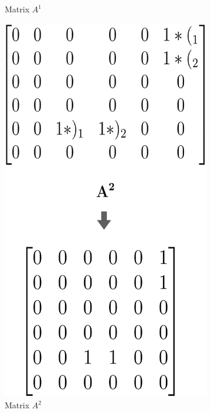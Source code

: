 \documentclass[xcolor=table,english]{beamer}
\begin{document}
\begin{frame}[fragile]
\begin{figure}
\begin{subfigure}[b]{0.2\textwidth}
            \caption{Matrix $A^1$}
        \end{subfigure}
        \hfill
        \begin{subfigure}[b]{0.268\textwidth}
            \includegraphics[width=\textwidth]{figures/cfpq_2.png}
            \caption{Matrix $A^2$}
        \end{subfigure}
        \hfill
        \begin{subfigure}[b]{0.297\textwidth}

\end{subfigure}
\end{figure}
\end{frame}
\end{document}
